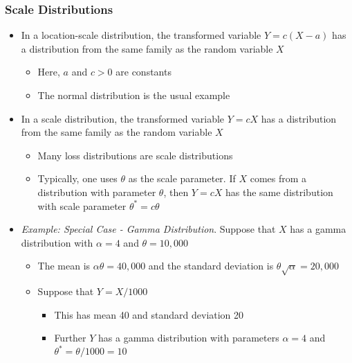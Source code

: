 \documentclass{beamer}
\begin{document}
\begin{frame}%
\frametitle{Scale Distributions}
\begin{itemize}
\item In a location-scale distribution, the transformed variable $Y = c(X-a)$ has a distribution from the same family as the random variable $X$ %
\begin{itemize}
\item Here, $a$ and $c>0$ are constants
\item The normal distribution is the usual example %
\end{itemize}
\item In a scale distribution,  the transformed variable $Y = c X$ has a distribution from the same family as the random variable $X$ %
\begin{itemize}
\item Many loss distributions are scale distributions
\item Typically, one uses $\theta$ as the scale parameter. If $X$ comes from a distribution with parameter $\theta$, then $Y = c X$ has the same distribution with scale parameter $\theta^{\ast} = c \theta$ %
\end{itemize}
\item \textit{Example: Special Case - Gamma Distribution}. Suppose that $X$ has a gamma distribution with $\alpha = 4$ and $\theta = 10,000$ %
\begin{itemize}
\item The mean is $\alpha \theta = 40,000$ and the standard deviation is $\theta \sqrt{\alpha} = 20,000$ %
\item Suppose that $Y = X/1000$
\begin{itemize}
\item This has mean 40 and standard deviation 20
\item Further $Y$ has a gamma distribution with parameters $\alpha = 4$ and $\theta^{\ast} = \theta/1000 = 10$\end{itemize}
\end{itemize}\end{itemize}
\end{frame}
\end{document}
